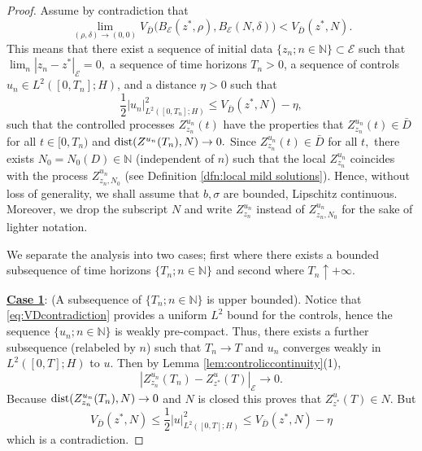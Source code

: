 \documentclass[10pt, reqno]{amsart}
\newcommand{\N}{\mathbb{N}}
\newcommand{\e}{\mathcal{E}}
\theoremstyle{definition}
\numberwithin{lem}{section}
\numberwithin{cor}{section}
\numberwithin{prop}{section}
\numberwithin{thm}{section}
\numberwithin{dfn}{section}
\begin{document}
\begin{proof}
Assume by contradiction that 
\[\lim_{(\rho, \delta)\rightarrow (0,0)} V_{\bar{D}}\big(B_\e(z^*,\rho), B_\e(N,\delta)\big) < V_{\bar{D}}(z^*,N).\]
This means that there exist a sequence of initial data $\{z_n;n\in\N\}\subset \e$ such that $\lim_n|z_n - z^*|_\e =0,$ a sequence of time horizons $T_n>0 $, a sequence of controls  $u_n \in L^2([0,T_n]; H)$, and a distance $\eta>0$ such that
\begin{equation}\label{eq:VDcontradiction}
    \frac{1}{2}|u_n|_{L^2([0,T_n]; H)}^2 \leq V_{\bar{D}}(z^*,N) - \eta,
\end{equation}
such that the controlled processes $Z^{u_n}_{z_n}(t)$ have the properties that $ Z^{u_n}_{z_n}(t) \in \bar{D}$  for all $t \in [0,T_n)$
and   $\textnormal{dist}(Z^{u_n}(T_n) ,N) \to 0.$ Since $Z^{u_n}_{z_n}(t) \in \bar{D}$ for all $t,$ there exists $N_0=N_0(D)\in\N$ (independent of $n$) such that the local $Z^{u_n}_{z_n}$ coincides with the process $Z^{u_n}_{z_n,N_0}$ (see Definition \ref{dfn:local mild solutions}). Hence, without loss of generality, we shall assume that $b, \sigma$ are bounded, Lipschitz continuous. Moreover, we drop the subscript $N$ and write $Z^{u_n}_{z_n}$ instead of $Z^{u_n}_{z_n,N_0}$ for the sake of lighter notation.

We separate the analysis into two cases; first where there exists a bounded subsequence of time horizons $\{T_n; n\in\N\}$ and second where $T_n \uparrow +\infty$.

\noindent \underline{\textbf{Case 1}}: (A subsequence of $\{T_n; n\in\N\}$ is upper bounded). Notice that \eqref{eq:VDcontradiction} provides a uniform $L^2$ bound for the controls, hence the sequence $\{u_n; n\in\N\}$ is weakly pre-compact. Thus, there exists a further subsequence (relabeled by $n$) such that $T_n \to T$ and $u_n$ converges weakly in $L^2([0,T];H)$ to $u$. Then by Lemma \ref{lem:controliccontinuity}(1), $$
    |Z^{u_n}_{z_n}(T_n) - Z^{u}_{z^*}(T)|_\e\rightarrow 0.$$
 Because $\textnormal{dist}(Z^{u_n}_{z_n}(T_n) ,N) \to 0$ and $N$ is closed this proves that $Z^{u}_{z^*}(T) \in N.$ But
\[    V_{\bar{D}}(z^*,N) \leq \frac{1}{2}|u|_{L^2([0,T];H)}^2 \leq V_{\bar{D}}(z^*,N) - \eta\]
which is a contradiction.


\end{proof}
\end{document}
